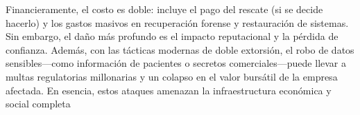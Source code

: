 \begin{tcolorbox}
Financieramente, el costo es doble: incluye el pago del rescate (si se decide hacerlo) y los gastos masivos en recuperación forense y restauración de sistemas. Sin embargo, el daño más profundo es el impacto reputacional y la pérdida de confianza. Además, con las tácticas modernas de doble extorsión, el robo de datos sensibles—como información de pacientes o secretos comerciales—puede llevar a multas regulatorias millonarias y un colapso en el valor bursátil de la empresa afectada. En esencia, estos ataques amenazan la infraestructura económica y social completa

\end{tcolorbox}